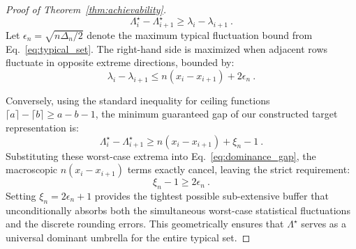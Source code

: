 \documentclass[a4paper,onecolumn,11pt]{quantumarticle}
\begin{document}
\begin{proof}[Proof of Theorem~\ref{thm:achievability}]
\begin{equation}\label{eq:dominance_gap}
    \Lambda^\star_i - \Lambda^\star_{i+1} \ge \lambda_i - \lambda_{i+1} \ .
\end{equation}
Let $\epsilon_n = \sqrt{n\Delta_n/2}$ denote the maximum typical fluctuation bound from Eq.~\eqref{eq:typical_set}. The right-hand side is maximized when adjacent rows fluctuate in opposite extreme directions, bounded by:
\begin{equation}
    \lambda_i - \lambda_{i+1} \le n(x_i - x_{i+1}) + 2\epsilon_n \ .
\end{equation}

Conversely, using the standard inequality for ceiling functions $\lceil a \rceil - \lceil b \rceil \ge a - b - 1$, the minimum guaranteed gap of our constructed target representation is:
\begin{equation}
    \Lambda^\star_i - \Lambda^\star_{i+1} \ge n(x_i - x_{i+1}) + \xi_n - 1 \ .
\end{equation}
Substituting these worst-case extrema into Eq.~\eqref{eq:dominance_gap}, the macroscopic $n(x_i - x_{i+1})$ terms exactly cancel, leaving the strict requirement:
\begin{equation}
    \xi_n - 1 \ge 2\epsilon_n \ .
\end{equation}
Setting $\xi_n = 2\epsilon_n + 1$ provides the tightest possible sub-extensive buffer that unconditionally absorbs both the simultaneous worst-case statistical fluctuations and the discrete rounding errors. This geometrically ensures that $\Lambda^\star$ serves as a universal dominant umbrella for the entire typical set.



\end{proof}
\end{document}

